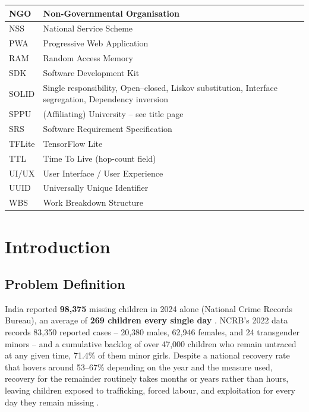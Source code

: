 \documentclass[12pt,a4paper,oneside]{report}
\begin{document}
\begin{longtable}{|p{3.2cm}|p{11cm}|}
NGO   & Non-Governmental Organisation \\ \hline
NSS   & National Service Scheme \\ \hline
PWA   & Progressive Web Application \\ \hline
RAM   & Random Access Memory \\ \hline
SDK   & Software Development Kit \\ \hline
SOLID & Single responsibility, Open--closed, Liskov substitution, Interface segregation, Dependency inversion \\ \hline
SPPU  & (Affiliating) University -- see title page \\ \hline
SRS   & Software Requirement Specification \\ \hline
TFLite & TensorFlow Lite \\ \hline
TTL   & Time To Live (hop-count field) \\ \hline
UI/UX & User Interface / User Experience \\ \hline
UUID  & Universally Unique Identifier \\ \hline
WBS   & Work Breakdown Structure \\
\hline
\end{longtable}

\newpage
{}
\onehalfspacing

\chapter{Introduction}

\section{Problem Definition}

India reported \textbf{98,375} missing children in 2024 alone (National Crime
Records Bureau), an average of \textbf{269 children every single day}
\cite{ncrb}. NCRB's 2022 data records 83,350 reported cases -- 20,380 males,
62,946 females, and 24 transgender minors -- and a cumulative backlog of over
47,000 children who remain untraced at any given time, 71.4\% of them minor
girls. Despite a national recovery rate that hovers around 53--67\% depending
on the year and the measure used, recovery for the remainder routinely takes
months or years rather than hours, leaving children exposed to trafficking,
forced labour, and exploitation for every day they remain missing
\cite{trackchild}.
\end{document}
